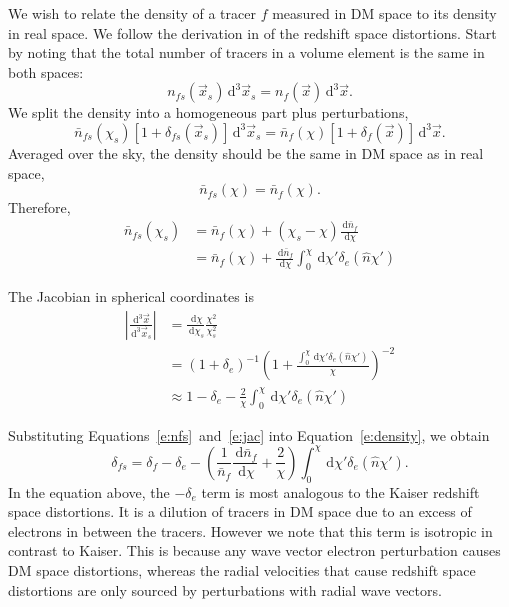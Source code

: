 \documentclass[twocolumn,prl,nofootinbib]{revtex4-1}
\newcommand{\ud}{\,\mathrm{d}}
\begin{document}
We wish to relate the density of a tracer $f$ measured in DM space to its
density in real space. We follow the derivation in \citet{Kaiser} of the
redshift space distortions. Start by noting that the total number of tracers
in a volume element is the same in both spaces:
\begin{equation}
\label{e:density}
n_{fs}(\vec x_s) \ud^3\vec x_s = n_{f}(\vec x) \ud^3\vec x.
\end{equation}
We split the density into a homogeneous part plus perturbations,
\begin{equation}
    \bar{n}_{fs}(\chi_s)\left[ 1 + \delta_{fs}(\vec x_s)\right] \ud^3\vec x_s
    = \bar{n}_{f}(\chi)\left[ 1 + \delta_f(\vec x)\right] \ud^3\vec x.
\end{equation}
Averaged over the sky, the density should be the same in DM 
space as in real space,
\begin{equation}
\bar{n}_{fs}(\chi) = \bar{n}_f(\chi).
\end{equation}
Therefore,
\begin{align}
\bar{n}_{fs}(\chi_s) 
    &= \bar{n}_{f}(\chi) + (\chi_s - \chi)\frac{\ud \bar{n}_f}{\ud \chi}\\
    &= \bar{n}_{f}(\chi)
       + \frac{\ud \bar{n}_f}{\ud \chi}\int_0^\chi \ud \chi' \delta_e(\hat n \chi')
       \label{e:nfs}
\end{align}

The Jacobian in spherical coordinates is
\begin{align}
\left| \frac{\ud^3\vec x}{\ud^3\vec x_s} \right|
    &= \frac{\ud \chi}{\ud \chi_s}\frac{\chi^2}{\chi_s^2}\\
    &= (1 + \delta_e)^{-1}
       \left(1 + \frac{\int_0^\chi \ud \chi' \delta_e(\hat n \chi')}
                      {\chi}\right)^{-2}\\
    &\approx 1 - \delta_e
        - \frac{2}{\chi}\int_0^\chi \ud \chi' \delta_e(\hat n \chi')
        \label{e:jac}
\end{align}

Substituting Equations~\ref{e:nfs}~and~\ref{e:jac} into Equation~\ref{e:density},
we obtain
\begin{equation}
\label{e:delta_s}
    \delta_{fs} = \delta_f - \delta_e
    - \left(\frac{1}{\bar{n}_f}\frac{\ud \bar{n}_f}{\ud \chi}
    + \frac{2}{\chi} \right)
        \int_0^\chi \ud \chi' \delta_e(\hat n \chi').
\end{equation}
In the equation above, the $-\delta_e$ term is most analogous to the Kaiser
redshift space distortions.  It is a dilution of tracers in DM space due to an
excess of electrons in between the tracers. However we note that this term is isotropic
in contrast to Kaiser.  This is because any wave vector electron perturbation
causes DM space distortions, whereas the radial velocities that cause
redshift space distortions are only sourced by perturbations with radial wave
vectors.
\end{document}
